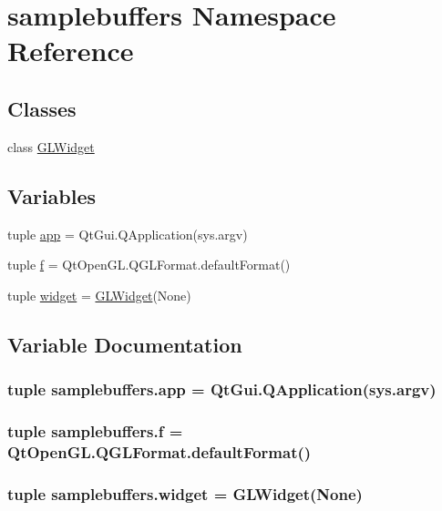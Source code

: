 \hypertarget{namespacesamplebuffers}{}\section{samplebuffers Namespace Reference}
\label{namespacesamplebuffers}
\subsection*{Classes}
\begin{DoxyCompactItemize}
\item 
class \hyperlink{classsamplebuffers_1_1GLWidget}{G\+L\+Widget}
\end{DoxyCompactItemize}
\subsection*{Variables}
\begin{DoxyCompactItemize}
\item 
tuple \hyperlink{namespacesamplebuffers_a363d3014d5383977dbc913176b26f1ff}{app} = Qt\+Gui.\+Q\+Application(sys.\+argv)
\item 
tuple \hyperlink{namespacesamplebuffers_ada3c8934bb2a9681a9eb3ac30d9f2983}{f} = Qt\+Open\+G\+L.\+Q\+G\+L\+Format.\+default\+Format()
\item 
tuple \hyperlink{namespacesamplebuffers_a8f6eec6a7e35eb5d2f48b26039b966de}{widget} = \hyperlink{classsamplebuffers_1_1GLWidget}{G\+L\+Widget}(None)
\end{DoxyCompactItemize}


\subsection{Variable Documentation}
\hypertarget{namespacesamplebuffers_a363d3014d5383977dbc913176b26f1ff}{}
\subsubsection[{app}]{\setlength{\rightskip}{0pt plus 5cm}tuple samplebuffers.\+app = Qt\+Gui.\+Q\+Application(sys.\+argv)}\label{namespacesamplebuffers_a363d3014d5383977dbc913176b26f1ff}
\hypertarget{namespacesamplebuffers_ada3c8934bb2a9681a9eb3ac30d9f2983}{}
\subsubsection[{f}]{\setlength{\rightskip}{0pt plus 5cm}tuple samplebuffers.\+f = Qt\+Open\+G\+L.\+Q\+G\+L\+Format.\+default\+Format()}\label{namespacesamplebuffers_ada3c8934bb2a9681a9eb3ac30d9f2983}
\hypertarget{namespacesamplebuffers_a8f6eec6a7e35eb5d2f48b26039b966de}{}
\subsubsection[{widget}]{\setlength{\rightskip}{0pt plus 5cm}tuple samplebuffers.\+widget = {\bf G\+L\+Widget}(None)}\label{namespacesamplebuffers_a8f6eec6a7e35eb5d2f48b26039b966de}
